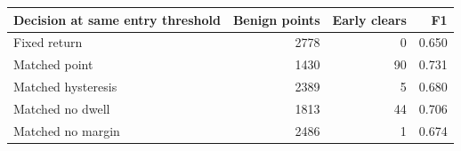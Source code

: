 \begin{tabular}{lrrr}
\toprule
Decision at same entry threshold & Benign points & Early clears & F1 \\
\midrule
Fixed return & 2778 & 0 & 0.650 \\
Matched point & 1430 & 90 & 0.731 \\
Matched hysteresis & 2389 & 5 & 0.680 \\
Matched no dwell & 1813 & 44 & 0.706 \\
Matched no margin & 2486 & 1 & 0.674 \\
\bottomrule
\end{tabular}
